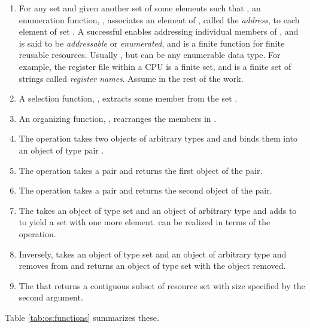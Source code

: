 \documentclass[draft]{article}
\begin{document}
\begin{enumerate}
\item  For any set   and  given another  set   of some
  elements such that , an enumeration function,
  ,  associates  an element  of
  ,  called the  \emph{address}, to  each element  of set
  .  A  successful  enables addressing  individual members of
  , and  is  said to be \emph{addressable} or \emph{enumerated},
  and  is a finite  function for  finite reusable  resources.  Usually
  , but  can be  any enumerable  data type.
  For example,  the register file  within a CPU  is a finite  set, and
    is  a finite  set  of  strings called  \emph{register
    names}.   Assume   in the  rest  of the
  work.
\item  A selection  function,  ,
  extracts some   member   from  the set
  .
\item An organizing function, , rearranges the
  members in .   
\item The  operation takes two objects of
  arbitrary types   and   and binds  them into an  object of
  type pair .
\item The   operation takes a  pair 
  and returns the first object of the pair.
\item The   operation takes a  pair 
  and returns the second object of the pair.
\item The   takes an object of type set 
  and an object of  arbitrary type  and adds  to   to yield a
  set with one more element.   can be realized in terms of the
   operation.
\item Inversely,  takes an  object of type
  set  and an object of arbitrary type  and removes  from 
  and returns an object of type set  with the object  removed.
\item  The    that returns  a
  contiguous subset  of resource  set  with  size specified  by the
  second argument.
\end{enumerate}
Table \ref{tab:os:functions} summarizes these.
\end{document}
